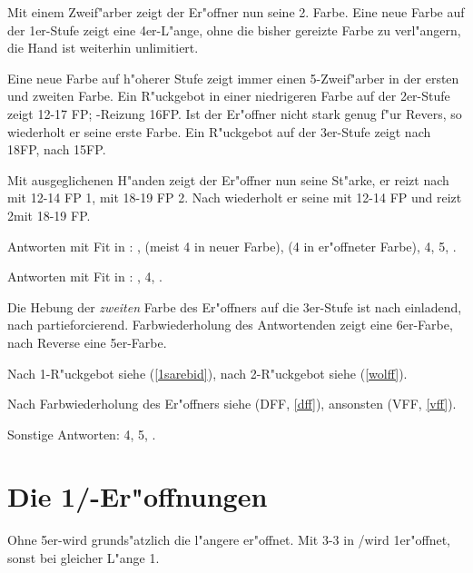 Mit einem Zweif"arber zeigt der Er"offner nun seine 2. Farbe. Eine neue Farbe
auf der 1er-Stufe zeigt eine 4er-L"ange, ohne die bisher gereizte Farbe zu
verl"angern, die Hand ist weiterhin unlimitiert.

Eine neue Farbe auf h"oherer Stufe zeigt immer einen 5\pl-Zweif"arber in
der ersten und zweiten Farbe.
Ein R"uckgebot in einer niedrigeren Farbe auf der 2er-Stufe zeigt 12-17 FP;
-Reizung 16\good{}\pl FP. Ist der Er"offner nicht stark genug f"ur
Revers, so wiederholt er seine erste Farbe. Ein R"uckgebot auf der 3er-Stufe
zeigt nach  18\pl FP, nach  15\pl FP.

Mit ausgeglichenen H"anden zeigt der Er"offner nun seine St"arke, er reizt nach
 mit 12-14 FP 1\SA, mit 18-19 FP 2\SA. Nach  wiederholt er seine \ofa mit
12-14 FP und reizt 2\SA mit 18-19 FP.

Antworten mit Fit in \ofa: ,
 (meist 4 in neuer Farbe),
 (4 in er"offneter Farbe), 4\SA {},
5\SA {}, .

Antworten mit Fit in \ufa: , 4\uf {}, .


Die Hebung der \emph{zweiten} Farbe des Er"offners auf die 3er-Stufe ist nach
 einladend, nach  partieforcierend. Farbwiederholung des
Antwortenden zeigt eine 6\pl{}er-Farbe, nach Reverse eine 5\pl{}er-Farbe.

Nach 1\SA-R"uckgebot siehe  (\ref{1sarebid}),
nach 2\SA-R"uckgebot siehe  (\ref{wolff}).

Nach Farbwiederholung des Er"offners siehe  (DFF,
\ref{dff}), ansonsten  (VFF, \ref{vff}).

Sonstige Antworten: 4\SA {}, 5\SA {}, .


%
%
\newpage
\section{Die 1\tre/\ka-Er"offnungen}

Ohne 5\pl{}er-\ofa wird grunds"atzlich die l"angere \uf er"offnet.
Mit 3-3 in \ka/\tr wird 1\tre er"offnet, sonst bei gleicher L"ange 1\kar.

